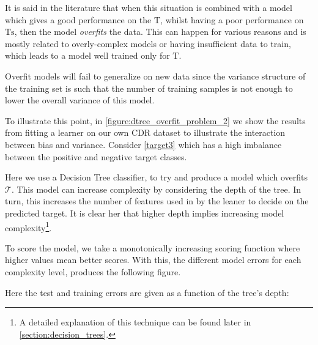 It is said in the literature that when this situation is combined with a model which gives a good performance on the $\mathrm{T}$, whilst having a poor performance on $\mathrm{Ts}$, then the model \textit{overfits} the data.
This can happen for various reasons and is mostly related to overly-complex models or having insufficient data to train, which leads to a model well trained only for $\mathrm{T}$.

Overfit models will fail to generalize on new data since the variance structure of the training set is such that the number of training samples is not enough to lower the overall variance of this model.




To illustrate this point, in \cref{figure:dtree_overfit_problem_2} we show the results from fitting a learner on our own CDR dataset to illustrate the interaction between bias and variance.
Consider \cref{target3} which has a high imbalance between the positive and negative target classes.

Here we use a Decision Tree classifier, to try and produce a model which overfits $\mathcal{T}$.
This model can increase complexity by considering the depth of the tree.
In turn, this increases the number of features used in by the leaner to decide on the predicted target.
It is clear her that higher depth implies increasing model complexity\footnote{A detailed explanation of this technique can be found later in \cref{section:decision_trees}.}.

To score the model, we take a monotonically increasing scoring function where
higher values mean better scores.
With this, the different model errors for each complexity level, produces the following figure.

Here the test and training errors are given as a function of the tree's depth:



